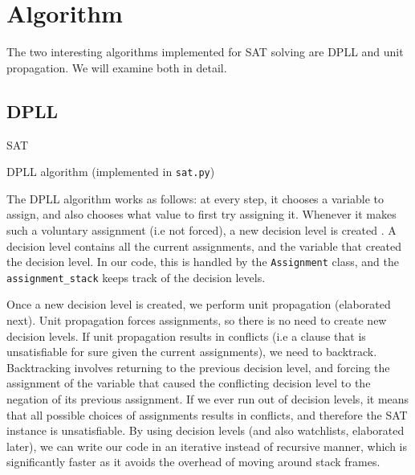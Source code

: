 \documentclass[11pt]{article}
\begin{document}
\section{Algorithm}

The two interesting algorithms implemented for SAT solving are DPLL and unit propagation. We will examine both in detail.

\subsection{DPLL}

\begin{algorithm}[H]
\SetAlgoLined
{}
  \Return SAT
 \caption{DPLL algorithm (implemented in \texttt{sat.py})}
\end{algorithm}

The DPLL algorithm works as follows: at every step, it chooses a variable to assign, and also chooses what value to first try assigning it. Whenever it makes such a voluntary assignment (i.e not forced), a new decision level is created \cite{katz}. A decision level contains all the current assignments, and the variable that created the decision level. In our code, this is handled by the \texttt{Assignment} class, and the \texttt{assignment\_stack} keeps track of the decision levels.

Once a new decision level is created, we perform unit propagation (elaborated next). Unit propagation forces assignments, so there is no need to create new decision levels. If unit propagation results in conflicts (i.e a clause that is unsatisfiable for sure given the current assignments), we need to backtrack. Backtracking involves returning to the previous decision level, and forcing the assignment of the variable that caused the conflicting decision level to the negation of its previous assignment. If we ever run out of decision levels, it means that all possible choices of assignments results in conflicts, and therefore the SAT instance is unsatisfiable. By using decision levels (and also watchlists, elaborated later), we can write our code in an iterative instead of recursive manner, which is significantly faster as it avoids the overhead of moving around stack frames.
\end{document}
